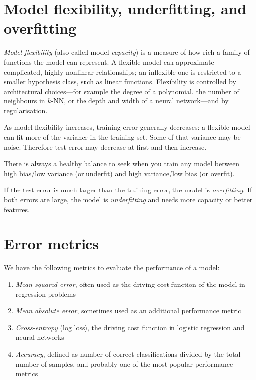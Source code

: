 \documentclass[a4paper, 12pt]{book}
\begin{document}
\section{Model flexibility, underfitting, and overfitting}

\emph{Model flexibility} (also called model \emph{capacity}) is a measure of how rich
a family of functions the model can represent. A flexible model can approximate
complicated, highly nonlinear relationships; an inflexible one is restricted to a
smaller hypothesis class, such as linear functions. Flexibility is controlled by
architectural choices---for example the degree of a polynomial, the number of
neighbours in $k$-NN, or the depth and width of a neural network---and by
regularisation.

As model flexibility increases, training error generally decreases: a flexible model can fit more of the variance in the training set. Some of that variance may be noise. Therefore test error may decrease at first and then increase. 

There is always a healthy balance to seek when you train any model
between high bias/low variance (or underfit) and high variance/low
bias (or overfit).

If the test error is much larger than the training error, the model is \emph{overfitting}. If both errors are large, the model is \emph{underfitting} and needs more capacity or better features.

\section{Error metrics}
We have the following metrics to evaluate the performance of a model:
\begin{enumerate}
\item \emph{Mean squared error}, often used as the driving cost
function of the model in regression problems
\item \emph{Mean absolute error}, sometimes used as an additional
performance metric
\item \emph{Cross-entropy} (log loss), the driving cost function
in logistic regression and neural networks
\item \emph{Accuracy}, defined as number of correct classifications
divided by the total number of samples, and probably
one of the most popular performance metrics
\end{enumerate}
\end{document}
